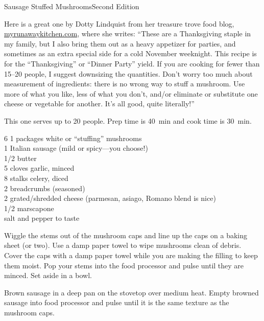 \begin{entry}{Sausage Stuffed Mushrooms}{Second Edition}

\begin{open}
  Here is a great one by Dotty Lindquist from her treasure trove food blog, \\
  \url{myrunawaykitchen.com}, where she writes: ``These are a Thanksgiving
  staple in my family, but I also bring them out as a heavy appetizer for
  parties, and sometimes as an extra special side for a cold November
  weeknight.  This recipe is for the ``Thanksgiving'' or ``Dinner Party''
  yield.  If you are cooking for fewer than \numrange{15}{20} people, I
  suggest downsizing the quantities.  Don’t worry too much about measurement
  of ingredients: there is no wrong way to stuff a mushroom.  Use more of what
  you like, less of what you don't, and/or eliminate or substitute one cheese
  or vegetable for another.  It's all good, quite literally!''

  This one serves up to 20 people.  Prep time is \SI{40}{\minute} and cook
  time is \SI{30}{\minute}.
\end{open}
\begin{ingredients}
    6 \SI{1}{\quart} packages white or ``stuffing'' mushrooms\\
    \SI{1}{\pound} Italian sausage (mild or spicy---you choose!)\\
    \SI{1/2}{\cup} butter\\
    5 cloves garlic, minced\\
    8 stalks celery, diced\\
    \SI{2}{\cup} breadcrumbs (seasoned)\\
    \SI{2}{\cup} grated/shredded cheese (parmesan, asiago, Romano blend is
    nice)\\
    \SI{1/2}{\cup} marscapone\\
    salt and pepper to taste
\end{ingredients}
Wiggle the stems out of the mushroom caps and line up the caps on a baking sheet
(or two). Use a damp paper towel to wipe mushrooms clean of debris. Cover the
caps with a damp paper towel while you are making the filling to keep them
moist. Pop your stems into the food processor and pulse until they are minced.
Set aside in a bowl.

Brown sausage in a deep pan on the stovetop over medium heat. Empty browned
sausage into food processor and pulse until it is the same texture as the
mushroom caps.


\end{entry}
